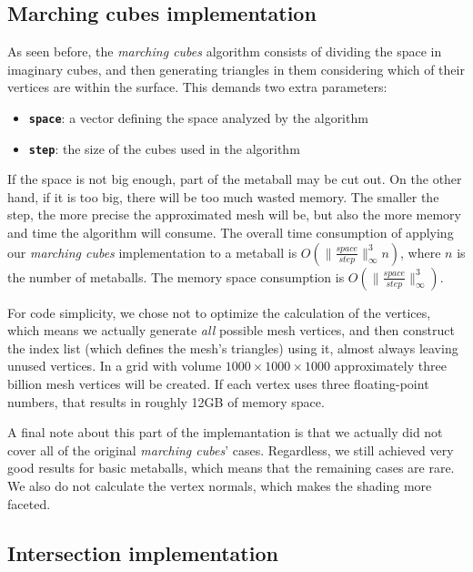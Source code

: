 \documentclass[conference]{acmsiggraph}
\begin{document}
\subsection{Marching cubes implementation}

As seen before, the \textit{marching cubes} algorithm consists of dividing the
space in imaginary cubes, and then generating triangles in them considering
which of their vertices are within the surface. This demands two extra
parameters:

\begin{itemize}
  \item \textbf{\texttt{space}}: a vector defining the space analyzed by the algorithm
  \item \textbf{\texttt{step}}: the size of the cubes used in the algorithm
\end{itemize}

If the space is not big enough, part of the metaball may be cut out. On the
other hand, if it is too big, there will be too much wasted memory. The smaller
the step, the more precise the approximated mesh will be, but also the more
memory and time the algorithm will consume. The overall time consumption of
applying our \textit{marching cubes} implementation to a metaball is
$O(\|\frac{space}{step}\|_\infty^3 n)$, where $n$ is the number of metaballs.
The memory space consumption is $O(\|\frac{space}{step}\|_\infty^3)$.

For code simplicity, we chose not to optimize the calculation of the vertices, which 
means we actually generate \textit{all} possible mesh vertices, and then construct
the index list (which defines the mesh's triangles) using it, almost always
leaving unused vertices. In a grid with volume $1000 \times 1000 \times 1000$
approximately three billion mesh vertices will be created. If each vertex uses
three floating-point numbers, that results in roughly 12GB of memory space.

A final note about this part of the implemantation is that we actually did not
cover all of the original \textit{marching cubes}' cases. Regardless, we still
achieved very good results for basic metaballs, which means that the remaining
cases are rare. We also do not calculate the vertex normals, which makes the
shading more faceted.

\subsection{Intersection implementation}
\end{document}
